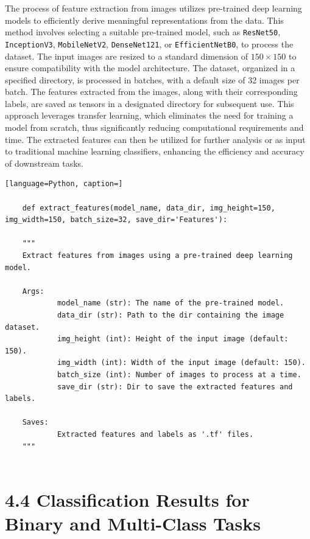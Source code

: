 \documentclass[12pt,a4paper]{report}
\begin{document}
\hspace{1cm}The process of feature extraction from images utilizes pre-trained deep learning models to efficiently derive meaningful representations from the data. This method involves selecting a suitable pre-trained model, such as \texttt{ResNet50}, \texttt{InceptionV3}, \texttt{MobileNetV2}, \texttt{DenseNet121}, or \texttt{EfficientNetB0}, to process the dataset. The input images are resized to a standard dimension of $150 \times 150$ to ensure compatibility with the model architecture. The dataset, organized in a specified directory, is processed in batches, with a default size of 32 images per batch. The features extracted from the images, along with their corresponding labels, are saved as tensors in a designated directory for subsequent use. This approach leverages transfer learning, which eliminates the need for training a model from scratch, thus significantly reducing computational requirements and time. The extracted features can then be utilized for further analysis or as input to traditional machine learning classifiers, enhancing the efficiency and accuracy of downstream tasks.
	
\begin{lstlisting}[language=Python, caption=]
	
	def extract_features(model_name, data_dir, img_height=150, img_width=150, batch_size=32, save_dir='Features'):
	
	"""
	Extract features from images using a pre-trained deep learning model.
	
	Args:
			model_name (str): The name of the pre-trained model.
			data_dir (str): Path to the dir containing the image dataset.
			img_height (int): Height of the input image (default: 150).
			img_width (int): Width of the input image (default: 150).
			batch_size (int): Number of images to process at a time.
			save_dir (str): Dir to save the extracted features and labels.
	
	Saves:
            Extracted features and labels as '.tf' files.
	"""
	
\end{lstlisting}


\section*{4.4 Classification Results for Binary and Multi-Class Tasks}
\end{document}
